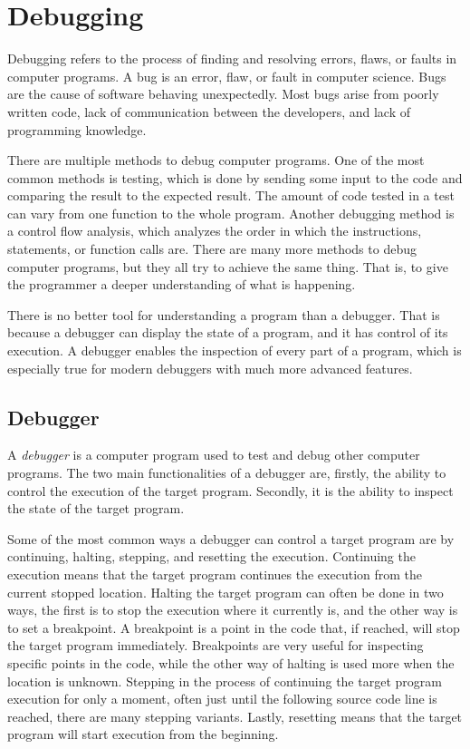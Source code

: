 \section{Debugging}
Debugging refers to the process of finding and resolving errors, flaws, or faults in computer programs.
A bug is an error, flaw, or fault in computer science.
Bugs are the cause of software behaving unexpectedly.
Most bugs arise from poorly written code, lack of communication between the developers, and lack of programming knowledge.


There are multiple methods to debug computer programs.
One of the most common methods is testing, which is done by sending some input to the code and comparing the result to the expected result.
The amount of code tested in a test can vary from one function to the whole program.
Another debugging method is a control flow analysis, which analyzes the order in which the instructions, statements, or function calls are.
There are many more methods to debug computer programs, but they all try to achieve the same thing.
That is, to give the programmer a deeper understanding of what is happening.


There is no better tool for understanding a program than a debugger.
That is because a debugger can display the state of a program, and it has control of its execution.
A debugger enables the inspection of every part of a program, which is especially true for modern debuggers with much more advanced features.


\subsection{Debugger}
A \emph{debugger} is a computer program used to test and debug other computer programs.
The two main functionalities of a debugger are, firstly, the ability to control the execution of the target program.
Secondly, it is the ability to inspect the state of the target program.


Some of the most common ways a debugger can control a target program are by continuing, halting, stepping, and resetting the execution.
Continuing the execution means that the target program continues the execution from the current stopped location.
Halting the target program can often be done in two ways, the first is to stop the execution where it currently is, and the other way is to set a breakpoint.
A breakpoint is a point in the code that, if reached, will stop the target program immediately.
Breakpoints are very useful for inspecting specific points in the code, while the other way of halting is used more when the location is unknown.
Stepping in the process of continuing the target program execution for only a moment, often just until the following source code line is reached, there are many stepping variants.
Lastly, resetting means that the target program will start execution from the beginning.


